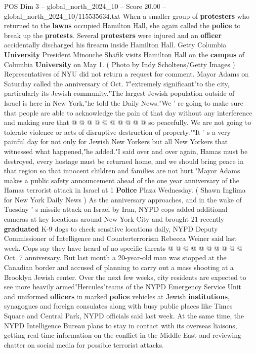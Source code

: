 \begin{textsample}{POS Dim 3 – global\_north\_2024\_10 – Score 20.00 – global\_north\_2024\_10/115535634.txt}
When a smaller group of \textbf{protesters} who returned to the \textbf{lawns} occupied Hamilton Hall, she again called the \textbf{police} to break up the \textbf{protests}.
Several \textbf{protesters} were injured and an \textbf{officer} accidentally discharged his firearm inside Hamilton Hall.
Getty Columbia \textbf{University} President Minouche Shafik visits Hamilton Hall on the \textbf{campus} of Columbia \textbf{University} on May 1. ( Photo by Indy Scholtens/Getty Images ) Representatives of NYU did not return a request for comment.
Mayor Adams on Saturday called the anniversary of Oct. 7"extremely significant"to the city, particularly its Jewish community."The largest Jewish population outside of Israel is here in New York,"he told the Daily News."We ' re going to make sure that people are able to acknowledge the pain of that day without any interference and making sure that @ @ @ @ @ @ @ @ @ @ so peacefully.
We are not going to tolerate violence or acts of disruptive destruction of property.""It ' s a very painful day for not only for Jewish New Yorkers but all New Yorkers that witnessed what happened,"he added."I said over and over again, Hamas must be destroyed, every hostage must be returned home, and we should bring peace in that region so that innocent children and families are not hurt."Mayor Adams makes a public safety announcement ahead of the one year anniversary of the Hamas terrorist attack in Israel at 1 \textbf{Police} Plaza Wednesday. ( Shawn Inglima for New York Daily News ) As the anniversary approaches, and in the wake of Tuesday ' s missile attack on Israel by Iran, NYPD cops added additional cameras at key locations around New York City and brought 21 recently \textbf{graduated} K-9 dogs to check sensitive locations daily, NYPD Deputy Commissioner of Intelligence and Counterterrorism Rebecca Weiner said last week.
Cops say they have heard of no specific threats @ @ @ @ @ @ @ @ @ @ Oct. 7 anniversary.
But last month a 20-year-old man was stopped at the Canadian border and accused of planning to carry out a mass shooting at a Brooklyn Jewish center.
Over the next few weeks, city residents are expected to see more heavily armed"Hercules"teams of the NYPD Emergency Service Unit and uniformed \textbf{officers} in marked \textbf{police} vehicles at Jewish \textbf{institutions}, synagogues and foreign consulates along with busy public places like Times Square and Central Park, NYPD officials said last week.
At the same time, the NYPD Intelligence Bureau plans to stay in contact with its overseas liaisons, getting real-time information on the conflict in the Middle East and reviewing chatter on social media for possible terrorist attacks.

\end{textsample}
